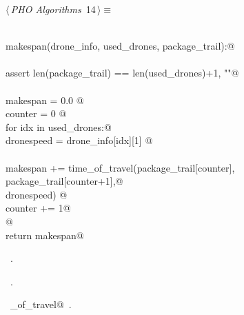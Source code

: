 \documentclass[10.0pt]{report}
\begin{document}
\begin{flushleft} \small
\begin{minipage}{\linewidth}\label{scrap7}\raggedright\small
{} $\langle\,${\itshape PHO Algorithms}\nobreak\ {\footnotesize {14}}$\,\rangle\equiv$
\vspace{-1ex}
\begin{list}{}{} \item
\mbox{}\verb@@\\
\mbox{}\verb@def makespan(drone_info, used_drones, package_trail):@\\
\mbox{}\verb@@\\
\mbox{}\verb@    assert len(package_trail) == len(used_drones)+1, ""@\\
\mbox{}\verb@@\\
\mbox{}\verb@    makespan = 0.0   @\\
\mbox{}\verb@    counter  = 0    @\\
\mbox{}\verb@    for idx in used_drones:@\\
\mbox{}\verb@         dronespeed    = drone_info[idx][1]          @\\
\mbox{}\verb@@\\
\mbox{}\verb@         makespan += time_of_travel(package_trail[counter],\@\\
\mbox{}\verb@                                    package_trail[counter+1],@\\
\mbox{}\verb@                                    dronespeed) @\\
\mbox{}\verb@         counter += 1@\\
\mbox{}\verb@    @\\
\mbox{}\verb@    return makespan@\\
\mbox{}\verb@@{\NWsep}
\end{list}
\vspace{-1.5ex}
\footnotesize
\begin{list}{}{\setlength{\itemsep}{-\parsep}\setlength{\itemindent}{-\leftmargin}}
\item \NWtxtMacroDefBy\ .
\item \NWtxtMacroRefIn\ .
\item \NWtxtIdentsUsed\nobreak\  \verb@time_of_travel@\nobreak\ .
\item{}
\end{list}
\end{minipage}\vspace{4ex}
\end{flushleft}
  
\end{document}
